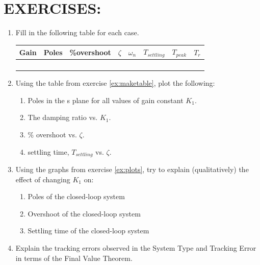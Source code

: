 \documentclass[11pt,a4paper]{article}
\begin{document}
\section{EXERCISES:}
\begin{enumerate} 
\item \label{ex:maketable} Fill in the following table for each case.
\begin{center}
\begin{tabular}{|c|c|c|c|c|c|c|c|}
\hline
Gain & Poles & \%overshoot & $\zeta$ & $\omega_{n}$ & $T_{settling}$ & $T_{peak}$ & $T_{r}$ \\ \hline
\qquad \qquad & \qquad \qquad & \qquad \qquad & \qquad \qquad & \qquad \qquad & \qquad \qquad & \qquad \qquad & \qquad \qquad \\ \hline 
\qquad \qquad & \qquad \qquad & \qquad \qquad & \qquad \qquad & \qquad \qquad & \qquad \qquad & \qquad \qquad & \qquad \qquad \\ \hline 
\qquad \qquad & \qquad \qquad & \qquad \qquad & \qquad \qquad & \qquad \qquad & \qquad \qquad & \qquad \qquad & \qquad \qquad \\ \hline 
\qquad \qquad & \qquad \qquad & \qquad \qquad & \qquad \qquad & \qquad \qquad & \qquad \qquad & \qquad \qquad & \qquad \qquad \\ \hline 

\end{tabular}
\end{center}


\item \label{ex:plots} Using the table from exercise \ref{ex:maketable}, plot the following:
\begin{enumerate}
\item Poles in the s plane for all values of gain constant $K_{1}$.
\item The damping ratio vs. $K_{1}$.
\item \% overshoot vs. $\zeta$.
\item settling time, $T_{settling}$ vs. $\zeta$.
\end{enumerate}

\item Using the graphs from exercise \ref{ex:plots}, try to explain (qualitatively) the effect of changing $K_{1}$ on:
\begin{enumerate}
\item Poles of the closed-loop system
\item Overshoot of the closed-loop system
\item Settling time of the closed-loop system
\end{enumerate}

\item Explain the tracking errors observed in the System Type and Tracking Error in terms of the Final Value Theorem.

\end{enumerate}
\end{document}
